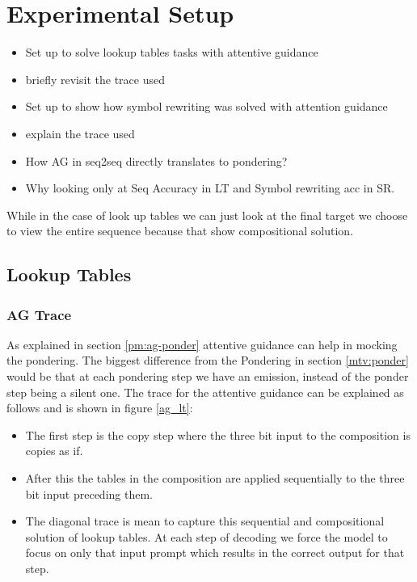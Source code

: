 \chapter{Experimental Setup}
\begin{itemize}
	\item Set up to solve lookup tables tasks with attentive guidance
	\item briefly revisit the trace used
	\item Set up to show how symbol rewriting was solved with attention guidance
	\item explain the trace used
	\item How AG in seq2seq directly translates to pondering?
	\item Why looking only at Seq Accuracy in LT and Symbol rewriting acc in SR.
\end{itemize}

While in the case of look up tables we can just look at the final target we choose to view the entire sequence because that show compositional solution.

\section{Lookup Tables} \label{exp:sr}

\subsection{AG Trace}
As explained in section \ref{pm:ag-ponder} attentive guidance can help in mocking the pondering. The biggest difference from the Pondering in section \ref{mtv:ponder} would be that at each pondering step we have an emission, instead of the ponder step being a silent one. The trace for the attentive guidance can be explained as follows and is shown in figure \ref{ag_lt}:
\begin{itemize}
	\item The first step is the copy step where the three bit input to the composition is copies as if.
	\item After this the tables in the composition are applied sequentially to the three bit input preceding them.
	\item The diagonal trace is mean to capture this sequential and compositional solution of lookup tables. At each step of decoding we force the model to focus on only that input prompt which results in the correct output for that step.
\end{itemize}


